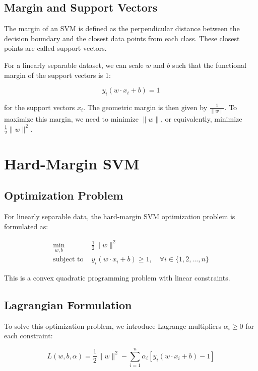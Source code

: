 \documentclass{article}
\begin{document}
\subsection{Margin and Support Vectors}

The margin of an SVM is defined as the perpendicular distance between the decision boundary and the closest data points from each class. These closest points are called support vectors.

For a linearly separable dataset, we can scale $w$ and $b$ such that the functional margin of the support vectors is 1:

\begin{equation}
y_i(w \cdot x_i + b) = 1
\end{equation}

for the support vectors $x_i$. The geometric margin is then given by $\frac{1}{\|w\|}$. To maximize this margin, we need to minimize $\|w\|$, or equivalently, minimize $\frac{1}{2}\|w\|^2$.

\section{Hard-Margin SVM}

\subsection{Optimization Problem}

For linearly separable data, the hard-margin SVM optimization problem is formulated as:

\begin{align}
\min_{w, b} & \frac{1}{2}\|w\|^2 \\
\text{subject to } & y_i(w \cdot x_i + b) \geq 1, \quad \forall i \in \{1, 2, \ldots, n\}
\end{align}

This is a convex quadratic programming problem with linear constraints.

\subsection{Lagrangian Formulation}

To solve this optimization problem, we introduce Lagrange multipliers $\alpha_i \geq 0$ for each constraint:

\begin{equation}
L(w, b, \alpha) = \frac{1}{2}\|w\|^2 - \sum_{i=1}^{n} \alpha_i [y_i(w \cdot x_i + b) - 1]
\end{equation}
\end{document}
